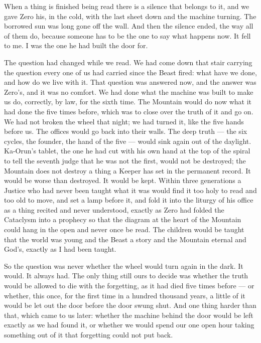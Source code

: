 
When a thing is finished being read there is a silence that belongs to it, and we gave Zero his, in the cold, with the last sheet down and the machine turning. The borrowed sun was long gone off the wall. And then the silence ended, the way all of them do, because someone has to be the one to say what happens now. It fell to me. I was the one he had built the door for.\par

The question had changed while we read. We had come down that stair carrying the question every one of us had carried since the Beast fired: what have we done, and how do we live with it. That question was answered now, and the answer was Zero's, and it was no comfort. We had done what the machine was built to make us do, correctly, by law, for the sixth time. The Mountain would do now what it had done the five times before, which was to close over the truth of it and go on. We had not broken the wheel that night; we had turned it, like the five hands before us. The offices would go back into their walls. The deep truth --- the six cycles, the founder, the hand of the five --- would sink again out of the daylight. Ka-Orun's tablet, the one he had cut with his own hand at the top of the spiral to tell the seventh judge that he was not the first, would not be destroyed; the Mountain does not destroy a thing a Keeper has set in the permanent record. It would be worse than destroyed. It would be kept. Within three generations a Justice who had never been taught what it was would find it too holy to read and too old to move, and set a lamp before it, and fold it into the liturgy of his office as a thing recited and never understood, exactly as Zero had folded the Cataclysm into a prophecy so that the diagram at the heart of the Mountain could hang in the open and never once be read. The children would be taught that the world was young and the Beast a story and the Mountain eternal and God's, exactly as I had been taught.\par

So the question was never whether the wheel would turn again in the dark. It would. It always had. The only thing still ours to decide was whether the truth would be allowed to die with the forgetting, as it had died five times before --- or whether, this once, for the first time in a hundred thousand years, a little of it would be let out the door before the door swung shut. And one thing harder than that, which came to us later: whether the machine behind the door would be left exactly as we had found it, or whether we would spend our one open hour taking something out of it that forgetting could not put back.\par

